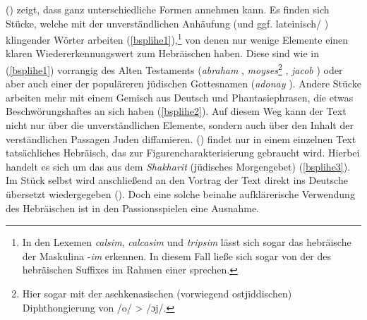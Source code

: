 \largerpage
\citeauthor{Frey1992} (\citeyear{Frey1992}) zeigt, dass \hai{{\LiHe}} ganz unterschiedliche Formen annehmen kann. Es finden sich Stücke, welche mit der unverständlichen Anhäufung  (und ggf. lateinisch/ ) klingender Wörter arbeiten (\ref{bsplihe1}),\footnote{In den Lexemen \textit{calsim}, \textit{calcasim} und \textit{tripsim} lässt sich sogar das hebräische  der Maskulina -\textit{im} erkennen. In diesem Fall ließe sich sogar von der  des hebräischen Suffixes im Rahmen einer  sprechen.} von denen nur wenige Elemente einen klaren Wiedererkennungswert zum Hebräischen haben. Diese sind wie in (\ref{bsplihe1}) vorrangig  des Alten Testaments (\textit{abraham} , \textit{moyses}\footnote{Hier sogar mit der aschkenasischen (vorwiegend ostjiddischen) Diphthongierung von /o\textlengthmark/ > /ɔj/.} , \textit{jacob} ) oder aber auch einer der populäreren jüdischen Gottesnamen (\textit{adonay} ). Andere Stücke arbeiten mehr mit einem Gemisch aus Deutsch und Phantasiephrasen, die etwas Beschwörungshaftes an sich haben (\ref{bsplihe2}). Auf diesem Weg kann der Text nicht nur über die unverständlichen Elemente, sondern auch über den Inhalt der verständlichen Passagen Juden diffamieren. \citeauthor{Frey1992} (\citeyear[62]{Frey1992}) findet nur in einem einzelnen Text tatsächliches Hebräisch, das zur Figurencharakterisierung gebraucht wird. Hierbei handelt es sich um das   aus dem  \textit{Shakharit} (jüdisches Morgengebet) (\ref{bsplihe3}). Im Stück selbst wird anschließend an den  Vortrag der Text direkt ins Deutsche übersetzt wiedergegeben (\citealt[62]{Frey1992}). Doch eine solche beinahe aufklärerische Verwendung des Hebräischen ist in den Passionsspielen eine Ausnahme. 

